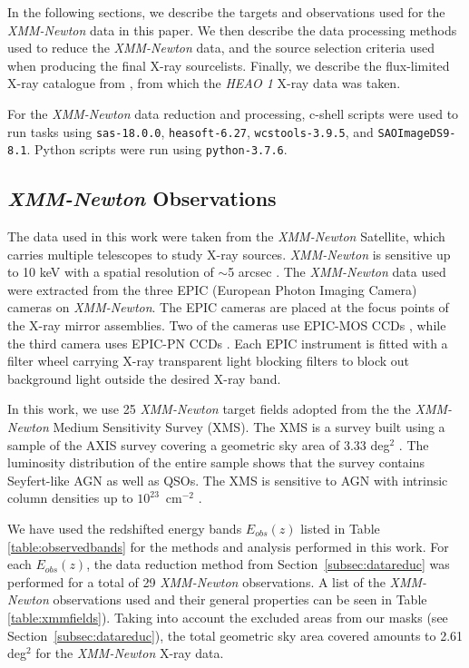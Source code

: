 \documentclass[fleqn,usenatbib]{mnras}
\begin{document}
In the following sections, we describe the targets and observations used for the \textit{XMM-Newton} data in this paper. 
We then describe the data processing methods used to reduce the \textit{XMM-Newton} data, and the source selection criteria used when producing the final X-ray sourcelists. 
Finally, we describe the flux-limited X-ray catalogue from \cite{piccinotti1982heao1xlf}, from which the \textit{HEAO 1} X-ray data was taken. 

For the \textit{XMM-Newton} data reduction and processing, c-shell scripts were used to run tasks using \texttt{sas-18.0.0}, \texttt{heasoft-6.27}, \texttt{wcstools-3.9.5}, and \texttt{SAOImageDS9-8.1}. 
Python scripts were run using \texttt{python-3.7.6}.
	
	
	\subsection{\textit{XMM-Newton} Observations}\label{subsec:xmmobs}  
	
	The data used in this work were taken from the \textit{XMM-Newton} Satellite, which carries multiple telescopes to study X-ray sources.
    \textit{XMM-Newton} is sensitive up to 10 keV with a spatial resolution of $\sim$5 arcsec \citep{jansen2001xmm}. 
    The \textit{XMM-Newton} data used were extracted from the three EPIC (European Photon Imaging Camera) cameras on \textit{XMM-Newton}. 
    The EPIC cameras are placed at the focus points of the X-ray mirror assemblies.
    Two of the cameras use EPIC-MOS CCDs \citep{turner2001european}, while the third camera uses EPIC-PN CCDs \citep{struder2001european}. 
    Each EPIC instrument is fitted with a filter wheel carrying X-ray transparent light blocking filters to block out background light outside the desired X-ray band.
	
	In this work, we use 25 \textit{XMM-Newton} target fields adopted from the the \textit{XMM-Newton} Medium Sensitivity Survey (XMS).
	The XMS is a survey built using a sample of the AXIS survey \citep{carrera2007xmm} covering a geometric sky area of 3.33 deg$^2$ \citep{ebrero2009xmm}. 
	The luminosity distribution of the entire sample shows that the survey contains Seyfert-like AGN as well as QSOs.
	The XMS is sensitive to AGN with intrinsic column densities up to $10^{23}$~cm$^{-2}$ \citep{mateos2005x}.
	
	We have used the redshifted energy bands $E_{obs}(z)$ listed in Table \ref{table:observedbands} for the methods and analysis performed in this work.
    For each $E_{obs}(z)$, the data reduction method from Section~\ref{subsec:datareduc} was performed for a total of 29 \textit{XMM-Newton} observations.
	A list of the \textit{XMM-Newton} observations used and their general properties can be seen in Table \ref{table:xmmfields}).
    Taking into account the excluded areas from our masks (see Section~\ref{subsec:datareduc}), the total geometric sky area covered amounts to 2.61 deg$^2$ for the \textit{XMM-Newton} X-ray data.
	
\end{document}
